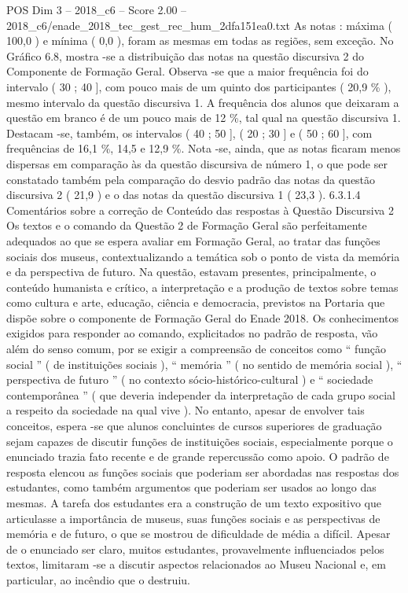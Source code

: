 \begin{textsample}{POS Dim 3 – 2018\_c6 – Score 2.00 – 2018\_c6/enade\_2018\_tec\_gest\_rec\_hum\_2dfa151ea0.txt}
As notas : máxima ( 100,0 ) e mínima ( 0,0 ), foram as mesmas em todas as regiões, sem exceção.
No Gráfico 6.8, mostra -se a distribuição das notas na questão discursiva 2 do Componente de Formação Geral.
Observa -se que a maior frequência foi do intervalo ( 30 ; 40 ], com pouco mais de um quinto dos participantes ( 20,9 \% ), mesmo intervalo da questão discursiva 1.
A frequência dos alunos que deixaram a questão em branco é de um pouco mais de 12 \%, tal qual na questão discursiva 1.
Destacam -se, também, os intervalos ( 40 ; 50 ], ( 20 ; 30 ] e ( 50 ; 60 ], com frequências de 16,1 \%, 14,5 e 12,9 \%.
Nota -se, ainda, que as notas ficaram menos dispersas em comparação às da questão discursiva de número 1, o que pode ser constatado também pela comparação do desvio padrão das notas da questão discursiva 2 ( 21,9 ) e o das notas da questão discursiva 1 ( 23,3 ). 6.3.1.4 Comentários sobre a correção de Conteúdo das respostas à Questão Discursiva 2 Os textos e o comando da Questão 2 de Formação Geral são perfeitamente adequados ao que se espera avaliar em Formação Geral, ao tratar das funções sociais dos museus, contextualizando a temática sob o ponto de vista da memória e da perspectiva de futuro.
Na questão, estavam presentes, principalmente, o conteúdo humanista e crítico, a interpretação e a produção de textos sobre temas como cultura e arte, educação, ciência e democracia, previstos na Portaria que dispõe sobre o componente de Formação Geral do Enade 2018.
Os conhecimentos exigidos para responder ao comando, explicitados no padrão de resposta, vão além do senso comum, por se exigir a compreensão de conceitos como “ função social ” ( de instituições sociais ), “ memória ” ( no sentido de memória social ), “ perspectiva de futuro ” ( no contexto sócio-histórico-cultural ) e “ sociedade contemporânea ” ( que deveria independer da interpretação de cada grupo social a respeito da sociedade na qual vive ).
No entanto, apesar de envolver tais conceitos, espera -se que alunos concluintes de cursos superiores de graduação sejam capazes de discutir funções de instituições sociais, especialmente porque o enunciado trazia fato recente e de grande repercussão como apoio.
O padrão de resposta elencou as funções sociais que poderiam ser abordadas nas respostas dos estudantes, como também argumentos que poderiam ser usados ao longo das mesmas.
A tarefa dos estudantes era a construção de um texto expositivo que articulasse a importância de museus, suas funções sociais e as perspectivas de memória e de futuro, o que se mostrou de dificuldade de média a difícil.
Apesar de o enunciado ser claro, muitos estudantes, provavelmente influenciados pelos textos, limitaram -se a discutir aspectos relacionados ao Museu Nacional e, em particular, ao incêndio que o destruiu.

\end{textsample}
